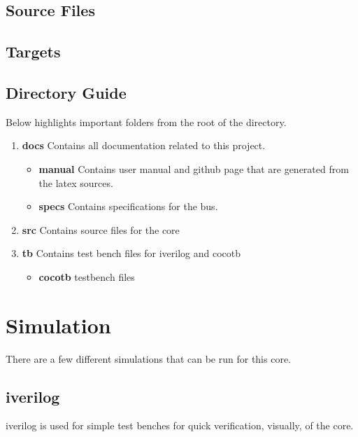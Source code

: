 \subsection{Source Files}



\subsection{Targets}



\subsection{Directory Guide}

\par
Below highlights important folders from the root of the directory.

\begin{enumerate}
  \item \textbf{docs} Contains all documentation related to this project.
    \begin{itemize}
      \item \textbf{manual} Contains user manual and github page that are generated from the latex sources.
      \item \textbf{specs} Contains specifications for the bus.
    \end{itemize}
  \item \textbf{src} Contains source files for the core
  \item \textbf{tb} Contains test bench files for iverilog and cocotb
    \begin{itemize}
      \item \textbf{cocotb} testbench files
    \end{itemize}
\end{enumerate}

\newpage

\section{Simulation}
\par
There are a few different simulations that can be run for this core.

\subsection{iverilog}
\par
iverilog is used for simple test benches for quick verification, visually, of the core.

